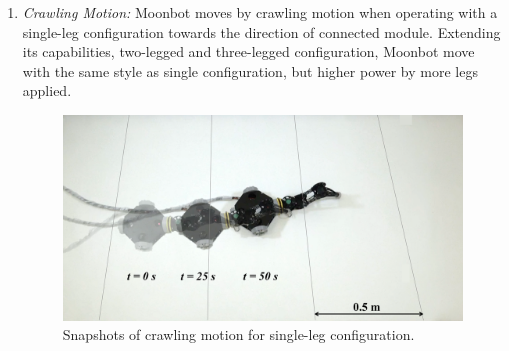 \label{enumerate}
\begin{enumerate}
\item \textit{Crawling Motion:}
Moonbot moves by crawling motion when operating with a single-leg configuration towards the direction of connected module. Extending its capabilities, two-legged and three-legged configuration, Moonbot move with the same style as single configuration, but higher power by more legs applied.\\


\begin{figure}[h]
  \centering
  \includegraphics[width=110mm]{./fig/chap3/snapshot/single_snapshot4.png}
  \vspace{2mm}
  \caption{Snapshots of crawling motion for single-leg configuration.}\label{singlesnap}
\end{figure}





\end{enumerate}
